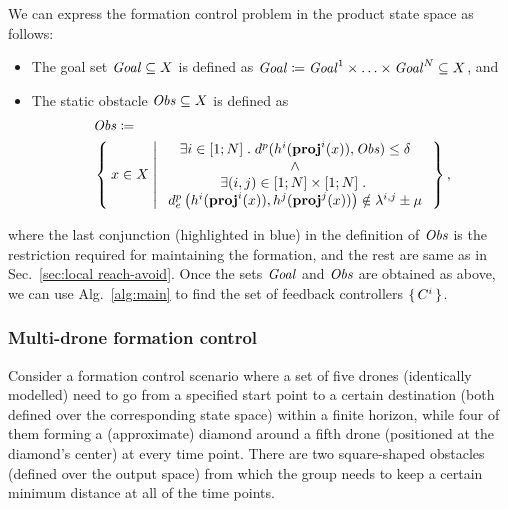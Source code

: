 We can express the formation control problem in the product state space as follows:
\begin{itemize}
	\item The goal set $\mathit{Goal}\subseteq X$ is defined as $\mathit{Goal} \coloneqq \mathit{Goal}^1\times \ldots \times \mathit{Goal}^N \subseteq X$, and
	\item The static obstacle $\mathit{Obs}\subseteq X$ is defined as 
		\begin{align}
			&\mathit{Obs} \coloneqq\\ 
			&\Set{ x\in X | 
				\begin{array}{c}
					\exists i\in [1;N]\;.\; d^{p}(h^i(\mathbf{proj}^i(x)),\mathit{Obs}) \leq \delta\\
					\wedge\\
					\exists (i,j)\in [1;N]\times [1;N]\;.\;\\ d^{p}_e\left(h^i(\mathbf{proj}^i(x)),h^j(\mathbf{proj}^j(x))\right)\notin\lambda^{i,j}\pm \mu
			\end{array}},					
		\end{align}
\end{itemize}
where the last conjunction (highlighted in blue) in the definition of $\mathit{Obs}$ is the restriction required for maintaining the formation, and the rest are same as in Sec.~\ref{sec:local reach-avoid}.
Once the sets $\mathit{Goal}$ and $\mathit{Obs}$ are obtained as above, we can use Alg.~\ref{alg:main} to find the set of feedback controllers $\set{C^i}$.

\subsubsection{Multi-drone formation control}
\label{subsec:formation_control}
Consider a formation control scenario where a set of five drones (identically modelled) need to go from a specified start point to a certain destination (both defined over the corresponding state space) within a finite horizon, while four of them forming a (approximate) diamond around a fifth drone (positioned at the diamond's center) at every time point. There are two square-shaped obstacles (defined over the output space) from which the group needs to keep a certain minimum distance at all of the time points. %

